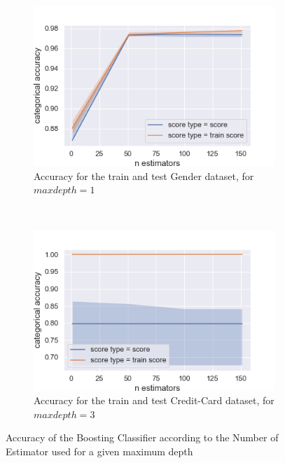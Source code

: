 \documentclass[10pt]{article}
\begin{document}
		\paragraph*{}
			\begin{figure}[h]
				\centering
				\begin{subfigure}[]{0.45\columnwidth}
					\centering
					\includegraphics[width=\linewidth]{../graphics/boost_gender_n_estimators_score_type_score_type.png}
					\caption{Accuracy for the train and test Gender dataset, for $maxdepth=1$}
					\label{boost:g_train_vs_test_es}
				\end{subfigure}
				~
				\begin{subfigure}[]{0.45\columnwidth}
					\centering
					\includegraphics[width=\linewidth]{../graphics/boost_creditcard_n_estimators_score_type_score_type.png}
					\caption{Accuracy for the train and test Credit-Card dataset, for $maxdepth=3$}
					\label{boost:cc_train_vs_test_es}
				\end{subfigure}
				\caption{Accuracy of the Boosting Classifier according to the Number of Estimator used for a given maximum depth}
				\label{boost:train_vs_test_es}
			\end{figure}
\end{document}
